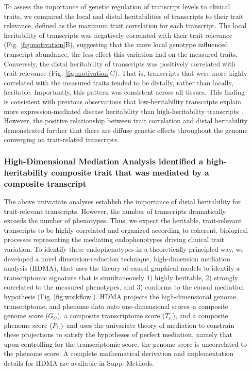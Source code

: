 \documentclass[
]{article}
\begin{document}
To assess the importance of genetic regulation of transcript levels to
clinical traits, we compared the local and distal heritabilities of
transcripts to their trait relevance, defined as the maximum trait
correlation for each transcript. The local heritability of transcripts
was negatively correlated with their trait relevance (Fig.
\ref{fig:motivation}B), suggesting that the more local genotype
influenced transcript abundance, the less effect this variation had on
the measured traits. Conversely, the distal heritability of transcripts
was positively correlated with trait relevance (Fig.
\ref{fig:motivation}C). That is, transcripts that were more highly
correlated with the measured traits tended to be distally, rather than
locally, heritable. Importantly, this pattern was consistent across all
tissues. This finding is consistent with previous observations that
low-heritability transcripts explain more expression-mediated disease
heritability than high-heritability transcripts \cite{pmid32424349}.
However, the positive relationship between trait correlation and distal
heritability demonstrated further that there are diffuse genetic effects
throughout the genome converging on trait-related transcripts.

\subsubsection{High-Dimensional Mediation Analysis identified a
high-heritability composite trait that was mediated by a composite
transcript}\label{high-dimensional-mediation-analysis-identified-a-high-heritability-composite-trait-that-was-mediated-by-a-composite-transcript}

The above univariate analyses establish the importance of distal
heritability for trait-relevant transcripts. However, the number of
transcripts dramatically exceeds the number of phenotypes. Thus, we
expect the heritable, trait-relevant transcripts to be highly correlated
and organized according to coherent, biological processes representing
the mediating endophenotypes driving clinical trait variation. To
identify these endophenotypes in a theoretically principled way, we
developed a novel dimension-reduction technique, high-dimension
mediation analysis (HDMA), that uses the theory of causal graphical
models to identify a transcriptomic signature that is simultaneously 1)
highly heritable, 2) strongly correlated to the measured phenotypes, and
3) conforms to the causal mediation hypothesis (Fig.
\ref{fig:workflow}). HDMA projects the high-dimensional genome,
transcriptome, and phenome data onto one-dimensional scores--a composite
genome score (\(G_C\)), a composite transcriptome score (\(T_C\)), and a
composite phenome score (\(P_C\))--and uses the univariate theory of
mediation to constrain these projections to satisfy the hypotheses of
perfect mediation, namely that upon controlling for the transcriptomic
score, the genome score is uncorrelated to the phenome score. A complete
mathematical derivation and implementation details for HDMA are
available in Supp. Methods.
\end{document}
